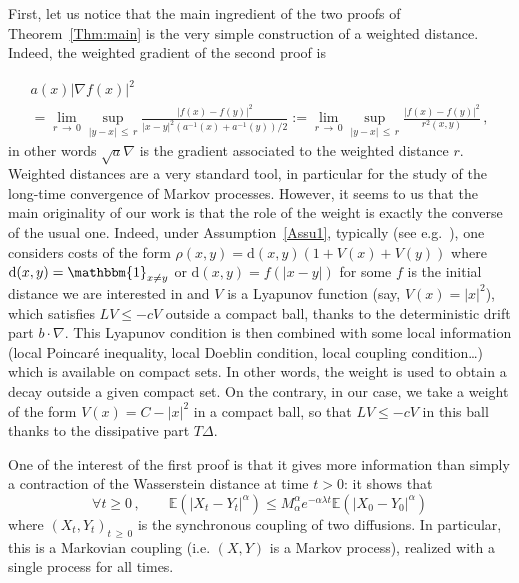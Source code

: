 \documentclass[AHL,Unicode,longabstracts,published]{cedram}
\newcommand{\bbE}{\mathbb E}
\newcommand{\na}{\nabla}
\newcommand{\1}{\mathbbm{1}}
\newcommand{\rmd}{\mathrm{d}}
\newcommand{\nv}[1]{#1}
\let\oldforall\forall
\renewcommand*{\forall}{\mathrel{\oldforall}}
\begin{document}
First, let us notice that the main ingredient of the two proofs of Theorem~\ref{Thm:main} is the very simple construction of a weighted distance. Indeed, the weighted gradient of the second proof is

\begin{multline*}
a(x) |\na f(x)|^2 \\
= \lim_{r\,\rightarrow\,0}\sup_{|y-x|\,\leqslant\,r} \frac{|f(x)-f(y)|^2}{|x-y|^2 \left( a^{-1}(x)+a^{-1}(y)\right)/2 } := \lim_{r\,\rightarrow\,0}\sup_{|y-x|\,\leqslant\,r} \frac{|f(x)-f(y)|^2}{r^2(x,y) }\,,
\end{multline*}
in other words $\sqrt{a}\na$ is the gradient associated to the weighted distance $r$. Weighted distances are a very standard tool, in particular for the study of the long-time convergence of Markov processes. However, it seems to us that the main originality of our work is that the role of the weight is exactly the converse of the usual one. Indeed, under Assumption~\ref{Assu1}, typically (see e.g.~\cite{EberleGuillinZimmer,EberleMajka,HMWasserstein,
HairerMattingly2008,MonmarcheElementary}), one considers \nv{costs} of the form $\rho(x,y) = \rmd(x,y)(1+V(x)+V(y))$ where $\rmd(x,y)=\1_{x\neq y}$ or $\rmd(x,y)=f(|x-y|)$ for some $f$ is the initial distance we are interested in and $V$ is a Lyapunov function (say, $V(x) = |x|^2$), which satisfies $LV\leqslant - cV$ outside a compact ball, thanks to the deterministic drift part $b\cdot \na$. This Lyapunov condition is then combined with some local information (local Poincaré inequality, local Doeblin condition, local coupling condition\dots) which is available on compact sets. In other words, the weight is used to obtain a decay outside a given compact set. On the contrary, in our case, we take a weight of the form $V(x) = C-|x|^2$ in a compact ball, so that $LV\leqslant -cV$ in this ball thanks to the dissipative part $T\Delta$.

One of the interest of the first proof is that it gives more information than simply a contraction of the Wasserstein distance at time $t>0$: it shows that
\[
\forall t\geqslant 0\,,\qquad \bbE \left( |X_t-Y_t|^\alpha\right) \leqslant M_\alpha^\alpha e^{-\alpha \lambda t} \bbE \left( |X_0-Y_0|^\alpha\right)
\]
where $(X_t,Y_t)_{t\,\geqslant\,0}$ is the synchronous coupling of two diffusions. In particular, this is a Markovian coupling (i.e. $(X,Y)$ is a Markov process), realized with a single process for all times.
\end{document}
